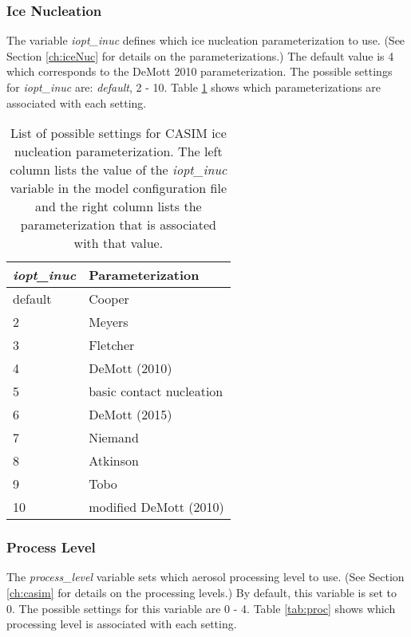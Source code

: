 \subsubsection{Ice Nucleation}
The variable \textit{iopt\_inuc} defines which ice nucleation parameterization to use. (See Section \ref{ch:iceNuc} for details on the parameterizations.) The default value is 4 which corresponds to the DeMott 2010 parameterization. The possible settings for \textit{iopt\_inuc} are: \textit{default}, 2 - 10. Table \ref{tab:inuc} shows which parameterizations are associated with each setting. \citep{casimCode}

\begin{table}[H]
	\centering
	\footnotesize
	\caption{List of possible settings for CASIM ice nucleation parameterization. The left column lists the value of the \textit{iopt\_inuc} variable in the model configuration file and the right column lists the parameterization that is associated with that value.}
	\label{tab:inuc}
	\begin{tabular}{|l|l|}
		\hline
		\textit{\textbf{iopt\_inuc}} & \textbf{Parameterization} \\ \hline
		default                      & Cooper                    \\ \hline
		2                            & Meyers                    \\ \hline
		3                            & Fletcher                  \\ \hline
		4                            & DeMott (2010)             \\ \hline
		5                            & basic contact nucleation  \\ \hline
		6                            & DeMott (2015)             \\ \hline
		7                            & Niemand                   \\ \hline
		8                            & Atkinson                  \\ \hline
		9                            & Tobo                      \\ \hline
		10                           & modified DeMott (2010)    \\ \hline
	\end{tabular}
\end{table}
\newpage
\subsubsection{Process Level}
The \textit{process\_level} variable sets which aerosol processing level to use. (See Section \ref{ch:casim} for details on the processing levels.) By default, this variable is set to 0. The possible settings for this variable are 0 - 4. Table \ref{tab:proc} shows which processing level is associated with each setting. \citep{casimCode}

